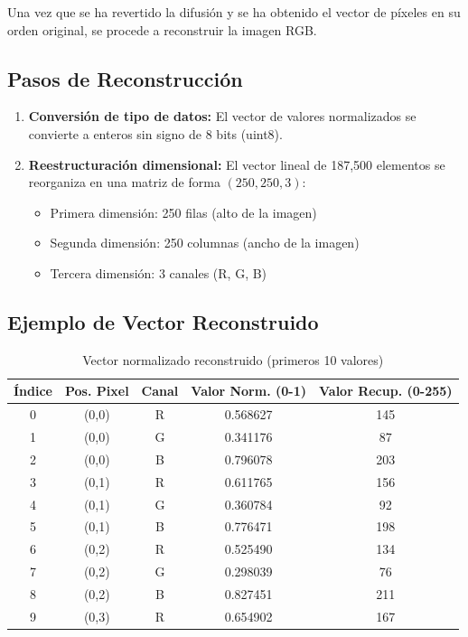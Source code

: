\documentclass[12pt,a4paper]{article}
\begin{document}
	Una vez que se ha revertido la difusión y se ha obtenido el vector de píxeles en su orden original, se procede a reconstruir la imagen RGB.
	
	\subsection{Pasos de Reconstrucción}
	
	\begin{enumerate}
		\item \textbf{Conversión de tipo de datos:} El vector de valores normalizados se convierte a enteros sin signo de 8 bits (uint8).
		
		\item \textbf{Reestructuración dimensional:} El vector lineal de 187,500 elementos se reorganiza en una matriz de forma $(250, 250, 3)$:
		\begin{itemize}
			\item Primera dimensión: 250 filas (alto de la imagen)
			\item Segunda dimensión: 250 columnas (ancho de la imagen)
			\item Tercera dimensión: 3 canales (R, G, B)
		\end{itemize}
	\end{enumerate}
	
	\subsection{Ejemplo de Vector Reconstruido}
	
	\begin{table}[H]
		\centering
		\caption{Vector normalizado reconstruido (primeros 10 valores)}
		\label{tab:vectorizacion_reconstruida}
		\footnotesize
		\begin{tabular}{@{}ccccc@{}}
			\toprule
			\textbf{Índice} & \textbf{Pos. Pixel} & \textbf{Canal} & \textbf{Valor Norm. (0-1)} & \textbf{Valor Recup. (0-255)} \\ \midrule
			0 & (0,0) & R & 0.568627 & 145 \\
			1 & (0,0) & G & 0.341176 & 87 \\
			2 & (0,0) & B & 0.796078 & 203 \\
			3 & (0,1) & R & 0.611765 & 156 \\
			4 & (0,1) & G & 0.360784 & 92 \\
			5 & (0,1) & B & 0.776471 & 198 \\
			6 & (0,2) & R & 0.525490 & 134 \\
			7 & (0,2) & G & 0.298039 & 76 \\
			8 & (0,2) & B & 0.827451 & 211 \\
			9 & (0,3) & R & 0.654902 & 167 \\ \bottomrule
		\end{tabular}
	\end{table}
	
\end{document}
